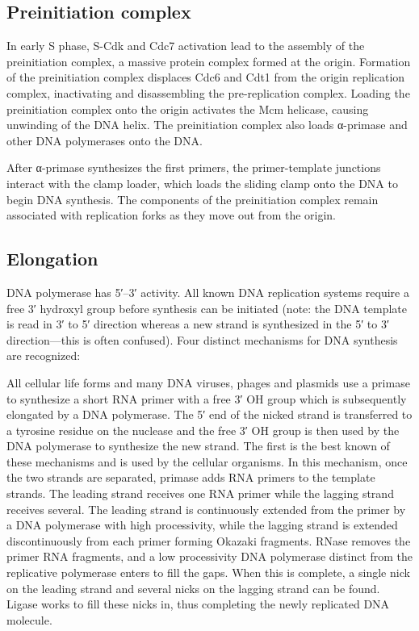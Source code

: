 \hypertarget{preinitiation-complex}{%
\subsection{Preinitiation complex}\label{preinitiation-complex}}

In early S phase, S-Cdk and Cdc7 activation lead to the assembly of the preinitiation complex, a massive protein complex formed at the origin. Formation of the preinitiation complex displaces Cdc6 and Cdt1 from the origin replication complex, inactivating and disassembling the pre-replication complex. Loading the preinitiation complex onto the origin activates the Mcm helicase, causing unwinding of the DNA helix. The preinitiation complex also loads α-primase and other DNA polymerases onto the DNA.

After α-primase synthesizes the first primers, the primer-template junctions interact with the clamp loader, which loads the sliding clamp onto the DNA to begin DNA synthesis. The components of the preinitiation complex remain associated with replication forks as they move out from the origin.

\hypertarget{elongation}{%
\subsection{Elongation}\label{elongation}}

DNA polymerase has 5′--3′ activity. All known DNA replication systems require a free 3′ hydroxyl group before synthesis can be initiated (note: the DNA template is read in 3′ to 5′ direction whereas a new strand is synthesized in the 5′ to 3′ direction---this is often confused). Four distinct mechanisms for DNA synthesis are recognized:

All cellular life forms and many DNA viruses, phages and plasmids use a primase to synthesize a short RNA primer with a free 3′ OH group which is subsequently elongated by a DNA polymerase. The 5′ end of the nicked strand is transferred to a tyrosine residue on the nuclease and the free 3′ OH group is then used by the DNA polymerase to synthesize the new strand.
The first is the best known of these mechanisms and is used by the cellular organisms. In this mechanism, once the two strands are separated, primase adds RNA primers to the template strands. The leading strand receives one RNA primer while the lagging strand receives several. The leading strand is continuously extended from the primer by a DNA polymerase with high processivity, while the lagging strand is extended discontinuously from each primer forming Okazaki fragments. RNase removes the primer RNA fragments, and a low processivity DNA polymerase distinct from the replicative polymerase enters to fill the gaps. When this is complete, a single nick on the leading strand and several nicks on the lagging strand can be found. Ligase works to fill these nicks in, thus completing the newly replicated DNA molecule.

